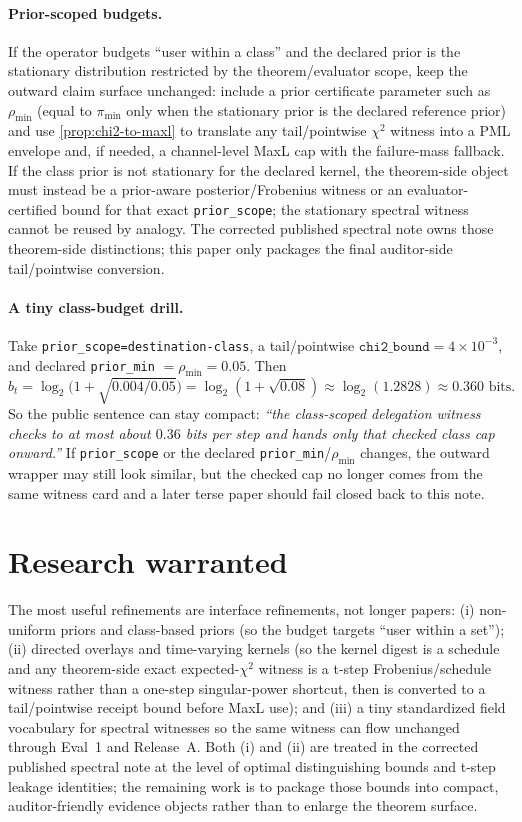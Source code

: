 \documentclass[11pt]{article}
\begin{document}
\paragraph{Prior-scoped budgets.}
If the operator budgets ``user within a class'' and the declared prior is the stationary distribution restricted by the theorem/evaluator scope, keep the outward claim surface unchanged: include a prior certificate parameter such as $\rho_{\min}$ (equal to $\pi_{\min}$ only when the stationary prior is the declared reference prior) and use \cref{prop:chi2-to-maxl} to translate any tail/pointwise $\chi^2$ witness into a PML envelope and, if needed, a channel-level MaxL cap with the failure-mass fallback. If the class prior is not stationary for the declared kernel, the theorem-side object must instead be a prior-aware posterior/Frobenius witness or an evaluator-certified bound for that exact \texttt{prior\_scope}; the stationary spectral witness cannot be reused by analogy. The corrected published spectral note owns those theorem-side distinctions; this paper only packages the final auditor-side tail/pointwise conversion.\cite{series:spectral}

\paragraph{A tiny class-budget drill.}
Take \texttt{prior\_scope=destination-class}, a tail/pointwise $\texttt{chi2\_bound}=4\times 10^{-3}$, and declared \texttt{prior\_min} $=\rho_{\min}=0.05$. Then
\[
 b_t = \log_2\!\Big(1+\sqrt{0.004/0.05}\Big)=\log_2(1+\sqrt{0.08})\approx \log_2(1.2828) \approx 0.360\text{ bits}.
\]
So the public sentence can stay compact: \emph{``the class-scoped delegation witness checks to at most about $0.36$ bits per step and hands only that checked class cap onward.''} If \texttt{prior\_scope} or the declared \texttt{prior\_min}/$\rho_{\min}$ changes, the outward wrapper may still look similar, but the checked cap no longer comes from the same witness card and a later terse paper should fail closed back to this note.

\section{Research warranted}
The most useful refinements are interface refinements, not longer papers:
(i) non-uniform priors and class-based priors (so the budget targets ``user within a set'');
(ii) directed overlays and time-varying kernels (so the kernel digest is a schedule and any theorem-side exact expected-$\chi^2$ witness is a t-step Frobenius/schedule witness rather than a one-step singular-power shortcut, then is converted to a tail/pointwise receipt bound before MaxL use); and
(iii) a tiny standardized field vocabulary for spectral witnesses so the same witness can flow unchanged through Eval~1 and Release~A.
Both (i) and (ii) are treated in the corrected published spectral note at the level of optimal distinguishing bounds and t-step leakage identities;\cite{series:spectral}
the remaining work is to package those bounds into compact, auditor-friendly evidence objects rather than to enlarge the theorem surface.
\end{document}
